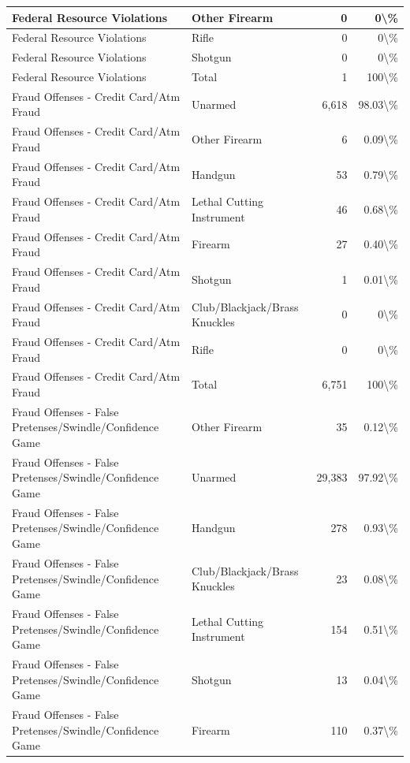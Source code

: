 \documentclass[
]{krantz}
\begin{document}
\begin{longtable}[t]{l|l|r|r}
\hline
Federal Resource Violations & Other Firearm & 0 & 0\textbackslash{}\%\\
\hline
Federal Resource Violations & Rifle & 0 & 0\textbackslash{}\%\\
\hline
Federal Resource Violations & Shotgun & 0 & 0\textbackslash{}\%\\
\hline
Federal Resource Violations & Total & 1 & 100\textbackslash{}\%\\
\hline
Fraud Offenses - Credit Card/Atm Fraud & Unarmed & 6,618 & 98.03\textbackslash{}\%\\
\hline
Fraud Offenses - Credit Card/Atm Fraud & Other Firearm & 6 & 0.09\textbackslash{}\%\\
\hline
Fraud Offenses - Credit Card/Atm Fraud & Handgun & 53 & 0.79\textbackslash{}\%\\
\hline
Fraud Offenses - Credit Card/Atm Fraud & Lethal Cutting Instrument & 46 & 0.68\textbackslash{}\%\\
\hline
Fraud Offenses - Credit Card/Atm Fraud & Firearm & 27 & 0.40\textbackslash{}\%\\
\hline
Fraud Offenses - Credit Card/Atm Fraud & Shotgun & 1 & 0.01\textbackslash{}\%\\
\hline
Fraud Offenses - Credit Card/Atm Fraud & Club/Blackjack/Brass Knuckles & 0 & 0\textbackslash{}\%\\
\hline
Fraud Offenses - Credit Card/Atm Fraud & Rifle & 0 & 0\textbackslash{}\%\\
\hline
Fraud Offenses - Credit Card/Atm Fraud & Total & 6,751 & 100\textbackslash{}\%\\
\hline
Fraud Offenses - False Pretenses/Swindle/Confidence Game & Other Firearm & 35 & 0.12\textbackslash{}\%\\
\hline
Fraud Offenses - False Pretenses/Swindle/Confidence Game & Unarmed & 29,383 & 97.92\textbackslash{}\%\\
\hline
Fraud Offenses - False Pretenses/Swindle/Confidence Game & Handgun & 278 & 0.93\textbackslash{}\%\\
\hline
Fraud Offenses - False Pretenses/Swindle/Confidence Game & Club/Blackjack/Brass Knuckles & 23 & 0.08\textbackslash{}\%\\
\hline
Fraud Offenses - False Pretenses/Swindle/Confidence Game & Lethal Cutting Instrument & 154 & 0.51\textbackslash{}\%\\
\hline
Fraud Offenses - False Pretenses/Swindle/Confidence Game & Shotgun & 13 & 0.04\textbackslash{}\%\\
\hline
Fraud Offenses - False Pretenses/Swindle/Confidence Game & Firearm & 110 & 0.37\textbackslash{}\%\\

\end{longtable}
\end{document}
